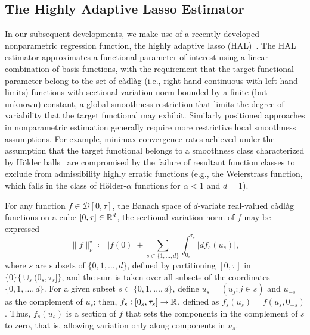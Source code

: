 \subsection{The Highly Adaptive Lasso Estimator}\label{one_hal_est}

In our subsequent developments, we make use of a recently developed
nonparametric regression function, the highly adaptive lasso
(HAL)~\citep{vdl2017generally, vdl2017uniform}. The HAL estimator approximates
a functional parameter of interest using a linear combination of basis
functions, with the requirement that the target functional parameter belong to
the set of c\`{a}dl\`{a}g (i.e., right-hand continuous with left-hand limits)
functions with sectional variation norm bounded by a finite (but unknown)
constant, a global smoothness restriction that limits the degree of variability
that the target functional may exhibit. Similarly positioned approaches in
nonparametric estimation generally require more restrictive local smoothness
assumptions. For example, minimax convergence rates achieved under the
assumption that the target functional belongs to a smoothness class
characterized by H{\"o}lder balls~\citep[e.g.,][]{robins2008higher,
robins2017minimax} are compromised by the failure of resultant function classes
to exclude from admissibility highly erratic functions (e.g., the Weierstrass
function, which falls in the class of H{\"o}lder-$\alpha$ functions for $\alpha
< 1$ and $d = 1$).

For any function $f \in \mathcal{D}[0,\tau]$, the Banach space of $d$-variate
real-valued c\`{a}dl\`{a}g functions on a cube $[0,\tau] \in \mathbb{R}^d$, the
sectional variation norm of $f$ may be expressed
\begin{equation*}
  \lVert f \rVert^{\star}_\nu \coloneqq \lvert f(0) \rvert + \sum_{s
  \subset\{1, \ldots, d\}} \int_{0_s}^{\tau_s} \lvert df_s(u_s) \rvert,
\end{equation*}
where $s$ are subsets of $\{0, 1, \ldots, d\}$, defined by partitioning
$[0,\tau]$ in $\{0\} \{ \cup_s (0_s,\tau_s]\}$, and the sum is taken over all
subsets of the coordinates $\{0,1,\ldots,d\}$. For a given subset $s \subset
\{0,1,\ldots,d\}$, define $u_s = (u_j : j \in s)$ and $u_{-s}$ as the complement
of $u_s$; then, $f_s: [0_s, \tau_s] \rightarrow \mathbb{R}$, defined as $f_s(u_s)
= f(u_s,0_{-s})$. Thus, $f_s(u_s)$ is a section of $f$ that sets the components
in the complement of $s$ to zero, that is, allowing variation only along
components in $u_s$.

